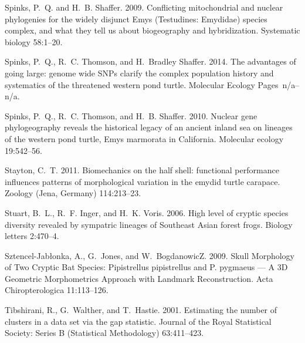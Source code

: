\documentclass[12pt,letterpaper]{article}
\begin{document}
\begin{thebibliography}{77}
Spinks, P.~Q. and H.~B. Shaffer. 2009. {Conflicting mitochondrial and nuclear
  phylogenies for the widely disjunct Emys (Testudines: Emydidae) species
  complex, and what they tell us about biogeography and hybridization.}
  Systematic biology 58:1--20.

Spinks, P.~Q., R.~C. Thomson, and H.~{Bradley Shaffer}. 2014. {The advantages
  of going large: genome wide SNPs clarify the complex population history and
  systematics of the threatened western pond turtle}. Molecular Ecology
  Pages~n/a--n/a.

Spinks, P.~Q., R.~C. Thomson, and H.~B. Shaffer. 2010. {Nuclear gene
  phylogeography reveals the historical legacy of an ancient inland sea on
  lineages of the western pond turtle, Emys marmorata in California.} Molecular
  ecology 19:542--56.

Stayton, C.~T. 2011. {Biomechanics on the half shell: functional performance
  influences patterns of morphological variation in the emydid turtle
  carapace.} Zoology (Jena, Germany) 114:213--23.

Stuart, B.~L., R.~F. Inger, and H.~K. Voris. 2006. {High level of cryptic
  species diversity revealed by sympatric lineages of Southeast Asian forest
  frogs.} Biology letters 2:470--4.

Sztencel-Jabłonka, A., G.~Jones, and W.~BogdanowicZ. 2009. {Skull Morphology
  of Two Cryptic Bat Species: Pipistrellus pipistrellus and P. pygmaeus — A
  3D Geometric Morphometrics Approach with Landmark Reconstruction}. Acta
  Chiropterologica 11:113--126.

Tibshirani, R., G.~Walther, and T.~Hastie. 2001. {Estimating the number of
  clusters in a data set via the gap statistic}. Journal of the Royal
  Statistical Society: Series B (Statistical Methodology) 63:411--423.


\end{thebibliography}
\end{document}

